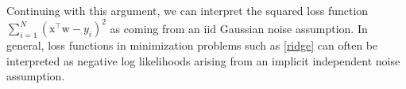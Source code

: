 \documentclass{article}
\newcommand{\trans}{^\top}
\renewcommand{\vec}[1]{\bm{\mathrm{#1}}}
\begin{document}
Continuing with this argument, we can interpret the squared loss
function $\sum_{i=1}^N (\vec{x}\trans \vec{w} - y_i)^2$ as coming from
an iid Gaussian noise assumption.  In general, loss functions in
minimization problems such as \eqref{ridge} can often be interpreted
as negative log likelihoods arising from an implicit independent noise
assumption.
\end{document}
